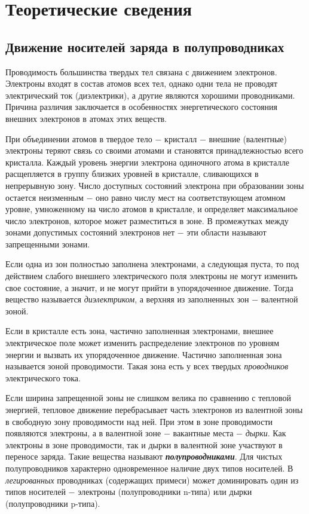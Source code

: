 \documentclass[a4paper,12pt]{article} %
\begin{document}
\section{Теоретические сведения}

\subsection{Движение носителей заряда в полупроводниках}
\hfill \break Проводимость большинства твердых тел связана с движением электронов. Электроны входят в состав атомов всех тел, однако одни тела не проводят электрический ток (диэлектрики), а другие являются хорошими проводниками. Причина различия заключается в особенностях энергетического состояния внешних электронов в атомах этих веществ. 

\hfill \break При объединении атомов в твердое тело $-$ кристалл $-$ внешние (валентные) электроны теряют связь со своими атомами и становятся принадлежностью всего кристалла. Каждый уровень энергии электрона одиночного атома в кристалле расщепляется в группу близких уровней в кристалле, сливающихся в непрерывную зону. Число доступных состояний электрона при образовании зоны остается неизменным $-$ оно равно числу мест на соответствующем атомном уровне, умноженному на число атомов в кристалле, и определяет максимальное число электронов, которое может разместиться в зоне. В промежутках между зонами допустимых состояний электронов нет $-$ эти области называют запрещенными зонами. 

\hfill \break Если одна из зон полностью заполнена электронами, а следующая пуста, то под действием слабого внешнего электрического поля электроны не могут изменить свое состояние, а значит, и не могут прийти в упорядоченное движение. Тогда вещество называется \textit{диэлектриком}, а верхняя из заполненных зон $-$ валентной зоной.

\hfill \break Если в кристалле есть зона, частично заполненная электронами, внешнее электрическое поле может изменить распределение электронов по уровням энергии и вызвать их упорядоченное движение. Частично заполненная зона называется зоной проводимости. Такая зона есть у всех твердых \textit{проводников} электрического тока.

\hfill \break Если ширина запрещенной зоны не слишком велика по сравнению с тепловой энергией, тепловое движение перебрасывает часть электронов из валентной зоны в свободную зону проводимости над ней. При этом в зоне проводимости появляются электроны, а в валентной зоне $-$ вакантные места $-$ \textit{дырки}. Как электроны в зоне проводимости, так и дырки в валентной зоне участвуют в переносе заряда. Такие вещества называют \textit{\textbf{полупроводниками}}. Для чистых полупроводников характерно одновременное наличие двух типов носителей. В \textit{легированных} проводниках (содержащих примеси) может доминировать один из типов носителей $-$ электроны (полупроводники n-типа) или дырки (полупроводники p-типа).
\end{document}
